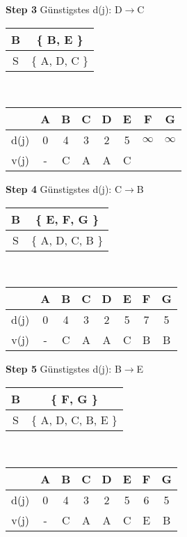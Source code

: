 \documentclass[a4paper,11pt]{article}
\begin{document}
{\begin{multicols}{2}
\textbf{Step 3} Günstigstes d(j): D$\to$C \\
\begin{tabular}{ |c|c| } 
  \hline
  B & \{ B, E \} \\
  \hline
  S & \{ A, D, C \} \\ 
  \hline
 \end{tabular} \\
\begin{tabular}{ |c|c|c|c|c|c|c|c| } 
  \hline
       & A & B & C & D & E & F & G \\
  \hline
  d(j) & 0 & 4 & 3 & 2 & 5 & $\infty$ & $\infty$ \\
  \hline
  v(j) & - & C & A & A & C &  &  \\
  \hline
\end{tabular}
\vspace{4mm}

\columnbreak

\textbf{Step 4} Günstigstes d(j): C$\to$B \\
\begin{tabular}{ |c|c| } 
  \hline
  B & \{ E, F, G \} \\
  \hline
  S & \{ A, D, C, B \} \\ 
  \hline
 \end{tabular} \\
\begin{tabular}{ |c|c|c|c|c|c|c|c| } 
  \hline
       & A & B & C & D & E & F & G \\
  \hline
  d(j) & 0 & 4 & 3 & 2 & 5 & 7 & 5 \\
  \hline
  v(j) & - & C & A & A & C & B & B \\
  \hline
\end{tabular}
\vspace{4mm}

\textbf{Step 5} Günstigstes d(j): B$\to$E \\
\begin{tabular}{ |c|c| } 
  \hline
  B & \{ F, G \} \\
  \hline
  S & \{ A, D, C, B, E \} \\ 
  \hline
 \end{tabular} \\
\begin{tabular}{ |c|c|c|c|c|c|c|c| } 
  \hline
       & A & B & C & D & E & F & G \\
  \hline
  d(j) & 0 & 4 & 3 & 2 & 5 & 6 & 5 \\
  \hline
  v(j) & - & C & A & A & C & E & B \\
  \hline
\end{tabular}
\vspace{4mm}


\end{multicols}}
\end{document}
